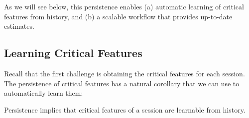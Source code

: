As we will see below, this persistence enables 
(a) automatic learning  of critical features from history, 
and (b) a scalable workflow that provides 
up-to-date estimates. 


\subsection{Learning Critical Features}
\label{subsec:cfa:design:learning}

Recall that the first challenge is
obtaining the critical features for each session.
The  persistence of  critical features has a natural 
corollary that we can use to automatically learn them: 

\begin{imp}
\vspace{0.1cm}
Persistence  implies that 
critical features of a session are learnable from history.
\vspace{-0.6cm}
\label{imp:learning}
\end{imp}



